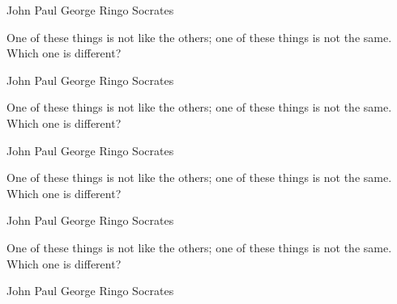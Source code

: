 \documentclass[answers,addpoints]{exam}
\begin{document}
\begin{questions}
\begin{randomizeoneparchoices}
\choice John
\choice Paul
\choice George
\choice Ringo
\CorrectChoice Socrates
\end{randomizeoneparchoices}
\question[5]
One of these things is not like the others; one of these
things is not the same. Which one is different?

\begin{randomizeoneparchoices}
\choice John
\choice Paul
\choice George
\choice Ringo
\CorrectChoice Socrates
\end{randomizeoneparchoices}
\question[5]
One of these things is not like the others; one of these
things is not the same. Which one is different?

\begin{randomizeoneparchoices}
\choice John
\choice Paul
\choice George
\choice Ringo
\CorrectChoice Socrates
\end{randomizeoneparchoices}
\question[5]
One of these things is not like the others; one of these
things is not the same. Which one is different?

\begin{randomizeoneparchoices}
\choice John
\choice Paul
\choice George
\choice Ringo
\CorrectChoice Socrates
\end{randomizeoneparchoices}
\question[5]
One of these things is not like the others; one of these
things is not the same. Which one is different?

\begin{randomizeoneparchoices}
\choice John
\choice Paul
\choice George
\choice Ringo
\CorrectChoice Socrates
\end{randomizeoneparchoices}



\end{questions}
\end{document}
